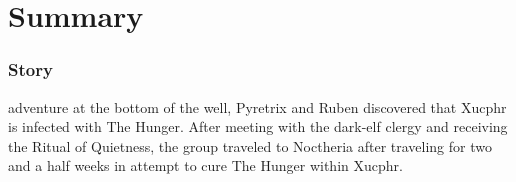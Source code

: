 \part*{Summary}
\section{Story}
 adventure at the bottom of the well, Pyretrix and Ruben discovered that Xucphr is infected with The Hunger. After meeting with the dark-elf clergy and receiving the Ritual of Quietness, the group traveled to Noctheria after traveling for two and a half weeks in attempt to cure The Hunger within Xucphr.
